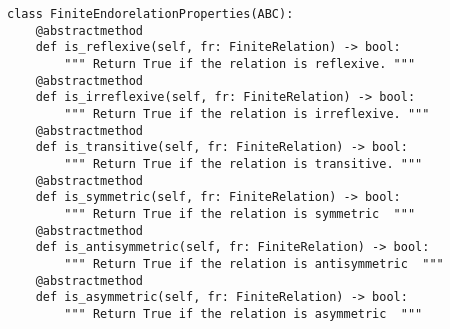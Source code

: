\par\begin{minipage}{61ex}
\begin{verbatim}
class FiniteEndorelationProperties(ABC):
    @abstractmethod
    def is_reflexive(self, fr: FiniteRelation) -> bool:
        """ Return True if the relation is reflexive. """
    @abstractmethod
    def is_irreflexive(self, fr: FiniteRelation) -> bool:
        """ Return True if the relation is irreflexive. """
    @abstractmethod
    def is_transitive(self, fr: FiniteRelation) -> bool:
        """ Return True if the relation is transitive. """
    @abstractmethod
    def is_symmetric(self, fr: FiniteRelation) -> bool:
        """ Return True if the relation is symmetric  """
    @abstractmethod
    def is_antisymmetric(self, fr: FiniteRelation) -> bool:
        """ Return True if the relation is antisymmetric  """
    @abstractmethod
    def is_asymmetric(self, fr: FiniteRelation) -> bool:
        """ Return True if the relation is asymmetric  """
\end{verbatim}
\end{minipage}\par